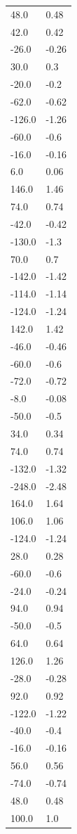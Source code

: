 \begin{longtable}{ll}
48.0 & 0.48 \\
42.0 & 0.42 \\
-26.0 & -0.26 \\
30.0 & 0.3 \\
-20.0 & -0.2 \\
-62.0 & -0.62 \\
-126.0 & -1.26 \\
-60.0 & -0.6 \\
-16.0 & -0.16 \\
6.0 & 0.06 \\
146.0 & 1.46 \\
74.0 & 0.74 \\
-42.0 & -0.42 \\
-130.0 & -1.3 \\
70.0 & 0.7 \\
-142.0 & -1.42 \\
-114.0 & -1.14 \\
-124.0 & -1.24 \\
142.0 & 1.42 \\
-46.0 & -0.46 \\
-60.0 & -0.6 \\
-72.0 & -0.72 \\
-8.0 & -0.08 \\
-50.0 & -0.5 \\
34.0 & 0.34 \\
74.0 & 0.74 \\
-132.0 & -1.32 \\
-248.0 & -2.48 \\
164.0 & 1.64 \\
106.0 & 1.06 \\
-124.0 & -1.24 \\
28.0 & 0.28 \\
-60.0 & -0.6 \\
-24.0 & -0.24 \\
94.0 & 0.94 \\
-50.0 & -0.5 \\
64.0 & 0.64 \\
126.0 & 1.26 \\
-28.0 & -0.28 \\
92.0 & 0.92 \\
-122.0 & -1.22 \\
-40.0 & -0.4 \\
-16.0 & -0.16 \\
56.0 & 0.56 \\
-74.0 & -0.74 \\
48.0 & 0.48 \\
100.0 & 1.0 \\

\end{longtable}
